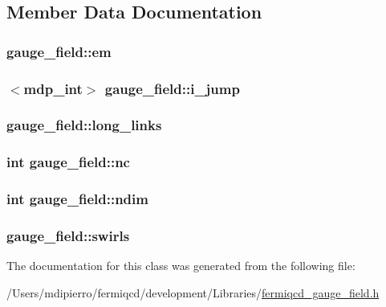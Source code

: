 \subsection{Member Data Documentation}
\hypertarget{classgauge__field_a8e12cc66b84dc51a33e0a942cc7c3f5c}{
\subsubsection[{em}]{ {\bf gauge\_\-field::em}}}
\label{classgauge__field_a8e12cc66b84dc51a33e0a942cc7c3f5c}
\hypertarget{classgauge__field_a3914ca4c0b33e495a2c1d34f158d6ce2}{
\subsubsection[{i\_\-jump}]{$<${\bf mdp\_\-int}$>$ {\bf gauge\_\-field::i\_\-jump}}}
\label{classgauge__field_a3914ca4c0b33e495a2c1d34f158d6ce2}
\hypertarget{classgauge__field_a2371b7cec512a57c18ba34269a5ba95a}{
\subsubsection[{long\_\-links}]{ {\bf gauge\_\-field::long\_\-links}}}
\label{classgauge__field_a2371b7cec512a57c18ba34269a5ba95a}
\hypertarget{classgauge__field_ada7f51e4041a64c45f484fc0a734a464}{
\subsubsection[{nc}]{\setlength{\rightskip}{0pt plus 5cm}int {\bf gauge\_\-field::nc}}}
\label{classgauge__field_ada7f51e4041a64c45f484fc0a734a464}
\hypertarget{classgauge__field_a6be2d71c62063374567046e00cfb0983}{
\subsubsection[{ndim}]{\setlength{\rightskip}{0pt plus 5cm}int {\bf gauge\_\-field::ndim}}}
\label{classgauge__field_a6be2d71c62063374567046e00cfb0983}
\hypertarget{classgauge__field_a8b62d947d9237b33c554f3490cd62335}{
\subsubsection[{swirls}]{ {\bf gauge\_\-field::swirls}}}
\label{classgauge__field_a8b62d947d9237b33c554f3490cd62335}


The documentation for this class was generated from the following file:\begin{DoxyCompactItemize}
\item 
/Users/mdipierro/fermiqcd/development/Libraries/\hyperlink{fermiqcd__gauge__field_8h}{fermiqcd\_\-gauge\_\-field.h}\end{DoxyCompactItemize}
